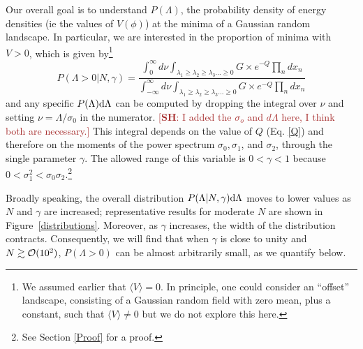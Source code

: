 \documentclass[12pt]{article}
\newcommand{\SH}[1]{\textcolor{brown}{[{\bf SH}: #1]}}
\begin{document}
Our  overall goal is to understand $P(\Lambda)$, the probability density of energy densities (ie the values of $V(\phi)$) at the minima of a Gaussian random landscape. In particular, we are interested in the proportion of  minima with $V > 0$, which is given by\footnote{We assumed earlier that $\langle V \rangle = 0$. In principle, one could consider an ``offset'' landscape, consisting of a Gaussian random field with zero mean, plus a constant, such that $\langle V \rangle \neq 0$ but we do not explore this here.}
\begin{equation} \label{PminIntegral}
  P(\Lambda >0| N,\gamma) =  \frac{\int^\infty_0 d\nu \int_{\lambda_1 \geq \lambda_2 \geq \lambda_3 \ldots \geq 0} G \times e^{-Q} \prod_n dx_n}{\int^\infty_{-\infty} d\nu \int_{\lambda_1 \geq \lambda_2 \geq \lambda_3 \ldots \geq 0} G \times e^{-Q} \prod_n dx_n}
  \end{equation}
 and any specific $P(\Lambda){\rm d}\Lambda$ can be computed by dropping the integral over $\nu$ and setting $\nu=\Lambda/\sigma_0$ in the numerator. \SH{I added the $\sigma_o$ and $d\Lambda$ here, I think both are necessary.}
%
This integral depends on the value of $Q$ (Eq. \ref{Q}) and therefore on the moments of the power spectrum $\sigma_0, \sigma_1$,  and $\sigma_2$, through the single parameter $\gamma$. The allowed range of this variable is $0<\gamma<1$ because $0<\sigma_1^2<\sigma_0\sigma_2$.\footnote{See Section \ref{Proof} for a proof.}


Broadly speaking, the overall distribution $P(\Lambda | N,\gamma){\rm d}\Lambda$ moves to lower values as $N$ and $\gamma$ are increased;  representative results for moderate $N$ are shown in Figure~\ref{distributions}. Moreover, as $\gamma$ increases, the width of the distribution contracts. Consequently, we will find that when $\gamma$ is close to unity and $N \gtrsim {\cal{O}}(10^2)$, $P(\Lambda >0)$ can be almost arbitrarily small, as we quantify below. 
\end{document}
